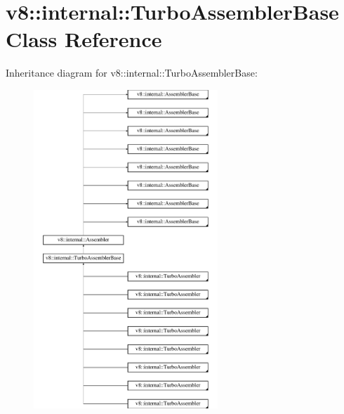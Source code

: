 \hypertarget{classv8_1_1internal_1_1TurboAssemblerBase}{}\section{v8\+:\+:internal\+:\+:Turbo\+Assembler\+Base Class Reference}
\label{classv8_1_1internal_1_1TurboAssemblerBase}
Inheritance diagram for v8\+:\+:internal\+:\+:Turbo\+Assembler\+Base\+:\begin{figure}[H]
\begin{center}
\leavevmode
\includegraphics[height=12.000000cm]{classv8_1_1internal_1_1TurboAssemblerBase}
\end{center}
\end{figure}
